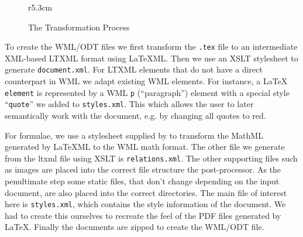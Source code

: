 \documentclass{llncs}
\def\latexml{{\LaTeX}ML\xspace}
\begin{document}
\begin{figure}r{5.3cm}\scriptsize\vspace*{-2em}
\caption{The Transformation Process}\label{fig:arch}\vspace*{-1em}
\end{figure}
To create the WML/ODT files we first transform the \texttt{.tex} file to an intermediate
XML-based \textsf{LTXML} format using \latexml. Then we use an XSLT stylesheet to generate
\texttt{document.xml}. For \textsf{LTXML} elements that do not have a direct counterpart
in WML we adapt existing WML elements. For instance, a {\LaTeX} \texttt{element} is
represented by a WML \texttt{p} (``paragraph'') element with a special style
``\texttt{quote}'' we added to \texttt{styles.xml}. This which allows the user to later
semantically work with the document, e.g. by changing all quotes to red. 

For formulae, we use a stylesheet supplied by to transform the MathML generated by
\latexml to the WML math format. The other file we generate from the ltxml file using XSLT
is \texttt{relations.xml}. The other supporting files such as images are placed into the
correct file structure the post-processor. As the penultimate step some static files, that
don't change depending on the input document, are also placed into the correct
directories. The main file of interest here is \texttt{styles.xml}, which contains the
style information of the document. We had to create this ourselves to recreate the feel of
the PDF files generated by {\LaTeX}. Finally the documents are zipped to create the
WML/ODT file.
\end{document}
